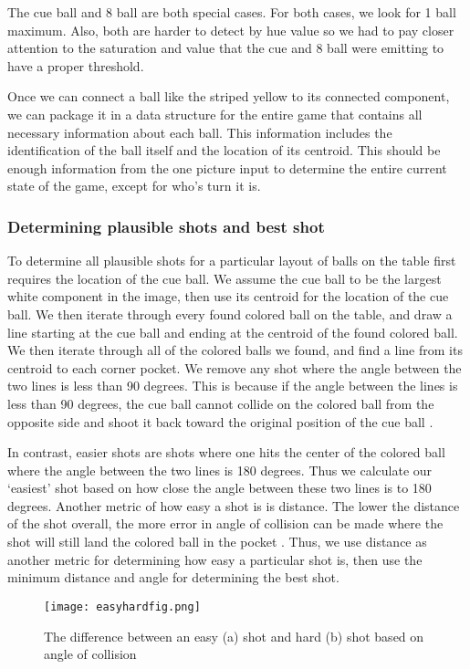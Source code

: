\documentclass[12pt]{report}
\begin{document}
	The cue ball and 8 ball are both special cases. For both cases, we look for 1 ball maximum. Also, both are harder to detect by hue value so we had to pay closer attention to the saturation and value that the cue and 8 ball were emitting to have a proper threshold. 
 
	Once we can connect a ball like the striped yellow to its connected component, we can package it in a data structure for the entire game that contains all necessary information about each ball. This information includes the identification of the ball itself and the location of its centroid. This should be enough information from the one picture input to determine the entire current state of the game, except for who’s turn it is.
	
\subsubsection*{Determining plausible shots and best shot}
To determine all plausible shots for a particular layout of balls on the table first requires the location of the cue ball. We assume the cue ball to be the largest white component in the image, then use its centroid for the location of the cue ball. We then iterate through every found colored ball on the table, and draw a line starting at the cue ball and ending at the centroid of the found colored ball. We then iterate through all of the colored balls we found, and find a line from its centroid to each corner pocket. We remove any shot where the angle between the two lines is less than 90 degrees. This is because if the angle between the lines is less than 90 degrees, the cue ball cannot collide on the colored ball from the opposite side and shoot it back toward the original position of the cue ball \cite{Jankunas:2014qr}.


 In contrast, easier shots are shots where one hits the center of the colored ball where the angle between the two lines is 180 degrees. Thus we calculate our ‘easiest’ shot based on how close the angle between these two lines is to 180 degrees. Another metric of how easy a shot is is distance. The lower the distance of the shot overall, the more error in angle of collision can be made where the shot will still land the colored ball in the pocket \cite{Jankunas:2014qr}. Thus, we use distance as another metric for determining how easy a particular shot is, then use the minimum distance and angle for determining the best shot. 
 
  \begin{figure}[htp]
    \centering
    \texttt{[image: easyhardfig.png]}
    \caption{The difference between an easy (a) shot and hard (b) shot based on angle of collision \cite{Jankunas:2014qr}}
    \label{fig:easyhard}
\end{figure}
 
\end{document}
